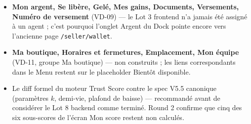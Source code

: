 \documentclass[11pt]{article}
\begin{document}
\begin{itemize}
  \item \textbf{Mon argent, Se libère, Gelé, Mes gains, Documents, Versements, Numéro de versement} (VD-09) — le Lot 3 frontend n'a jamais été assigné à un agent ; c'est pourquoi l'onglet \og Argent\fg{} du Dock pointe encore vers l'ancienne page \texttt{/seller/wallet}.
  \item \textbf{Ma boutique, Horaires et fermetures, Emplacement, Mon équipe} (VD-11, groupe \og Ma boutique\fg{}) — non construits ; les liens correspondants dans le Menu restent sur le placeholder \og Bientôt disponible\fg{}.
  \item Le diff formel du moteur Trust Score contre le spec V5.5 canonique (paramètres $k$, demi-vie, plafond de baisse) — recommandé avant de considérer le Lot 8 backend comme terminé. Round 2 confirme que cinq des six sous-scores de l'écran \og Mon score\fg{} restent non calculés.
\end{itemize}
\end{document}
